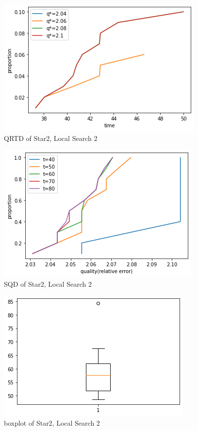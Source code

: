 \documentclass[acmlarge]{acmart}
\begin{document}
\begin{figure}[p]
	\includegraphics[width=\linewidth]{star2_LS2_QRTD.png}
	\caption{QRTD of Star2, Local Search 2}
\end{figure}


\begin{figure}[p]
	\includegraphics[width=\linewidth]{star2_LS2_SQD.png}
	\caption{SQD of Star2, Local Search 2}
\end{figure}

\begin{figure}[p]
	\includegraphics[width=\linewidth]{star2_LS2_box.png}
	\caption{boxplot of Star2, Local Search 2}
\end{figure}
\end{document}
